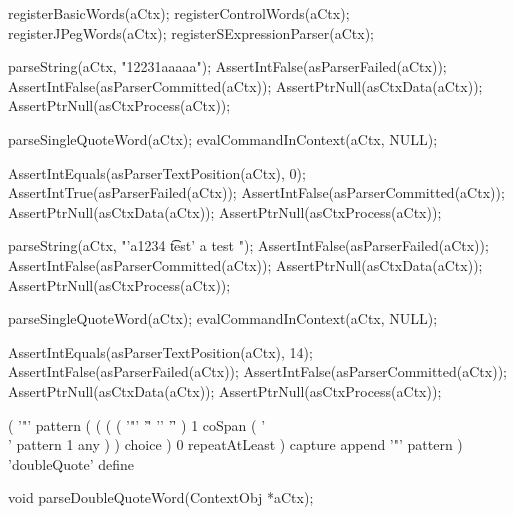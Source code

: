   registerBasicWords(aCtx);
  registerControlWords(aCtx);
  registerJPegWords(aCtx);
  registerSExpressionParser(aCtx);
\stopCTest

\startCTest
  parseString(aCtx, "12231aaaaa");
  AssertIntFalse(asParserFailed(aCtx));
  AssertIntFalse(asParserCommitted(aCtx));
  AssertPtrNull(asCtxData(aCtx));
  AssertPtrNull(asCtxProcess(aCtx));

  parseSingleQuoteWord(aCtx);
  evalCommandInContext(aCtx, NULL);
  
  AssertIntEquals(asParserTextPosition(aCtx), 0);
  AssertIntTrue(asParserFailed(aCtx));
  AssertIntFalse(asParserCommitted(aCtx));
  AssertPtrNull(asCtxData(aCtx));
  AssertPtrNull(asCtxProcess(aCtx));
\stopCTest
\stopTestCase

\startCTest
  parseString(aCtx, "'a1234 \t test' a test ");
  AssertIntFalse(asParserFailed(aCtx));
  AssertIntFalse(asParserCommitted(aCtx));
  AssertPtrNull(asCtxData(aCtx));
  AssertPtrNull(asCtxProcess(aCtx));
  
  parseSingleQuoteWord(aCtx);
  evalCommandInContext(aCtx, NULL);
  
  AssertIntEquals(asParserTextPosition(aCtx), 14);
  AssertIntFalse(asParserFailed(aCtx));
  AssertIntFalse(asParserCommitted(aCtx));
  AssertPtrNull(asCtxData(aCtx));
  AssertPtrNull(asCtxProcess(aCtx));
\stopCTest
\stopTestCase
\stopTestSuite

\startTestSuite[parseDoubleQuoteWord]

\starttyping
(
  '"' pattern
  (
    ( 
      (
        ( '"' '\r' '\n' '\f' ) 1 coSpan
        ( '\\' pattern 1 any )
      ) choice
    ) 0 repeatAtLeast
  ) capture append
  '"' pattern
) 'doubleQuote' define
\stoptyping

\startCHeader
void parseDoubleQuoteWord(ContextObj *aCtx);
\stopCHeader

